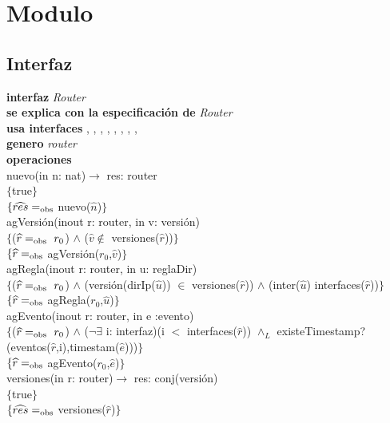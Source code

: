 \section*{Modulo }

\subsection*{Interfaz}
\textbf{interfaz} \textit{Router}\\
\textbf{se explica con la especificaci\'on de} \textit{Router}\\
\textbf{usa interfaces} , , , , , , , , \\
\textbf{genero} \textit{router}\\
\textbf{operaciones}\\

nuevo(in n: nat)$\rightarrow$ res: router\\
$\{$true$\}$\\
$\{\widehat{res} =_{\mathrm{obs}}$ nuevo($\widehat{n}$)$\}$\\

agVersi\'on(inout r: router, in v: versi\'on)\\
$\{$($\widehat{r} =_{\mathrm{obs}}\ r_0$) $\wedge$ ($\widehat{v} \notin$ versiones($\widehat{r}$))$\}$\\
$\{\widehat{r} =_{\mathrm{obs}}$ agVersi\'on($r_0$,$\widehat{v}$)$\}$\\

agRegla(inout r: router, in u: reglaDir)\\
$\{$($\widehat{r} =_{\mathrm{obs}}\ r_0$) $\wedge$ (versi\'on(dirIp($\widehat{u}$)) $\in$ versiones($\widehat{r}$)) $\wedge$ (inter($\widehat{u}$) interfaces($\widehat{r}$))$\}$\\
$\{\widehat{r} =_{\mathrm{obs}}$ agRegla($r_0$,$\widehat{u}$)$\}$\\

agEvento(inout r: router, in e :evento)\\
$\{$($\widehat{r} =_{\mathrm{obs}}\ r_0$) $\wedge$ ($\neg \exists$ i: interfaz)(i $<$ interfaces($\widehat{r}$)) $\wedge_L$ existeTimestamp?(eventos($\widehat{r}$,i),timestam($\widehat{e}$)))$\}$\\
$\{\widehat{r}=_{\mathrm{obs}}$ agEvento($r_0$,$\widehat{e}$)$\}$\\

versiones(in r: router)$\longrightarrow$ res: conj(versi\'on)\\
$\{$true$\}$\\
$\{\widehat{res}=_{\mathrm{obs}}$ versiones($\widehat{r}$)$\}$\\

